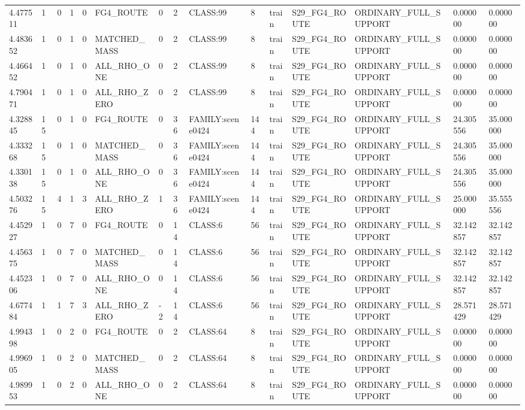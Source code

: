 \begin{tabular}{lllllllllllllll}
4.477511 & 1 & 0 & 1 & 0 & FG4\_ROUTE & 0 & 2 & CLASS:99 & 8 & train & S29\_FG4\_ROUTE & ORDINARY\_FULL\_SUPPORT & 0.000000 & 0.000000 \\
4.483652 & 1 & 0 & 1 & 0 & MATCHED\_MASS & 0 & 2 & CLASS:99 & 8 & train & S29\_FG4\_ROUTE & ORDINARY\_FULL\_SUPPORT & 0.000000 & 0.000000 \\
4.466452 & 1 & 0 & 1 & 0 & ALL\_RHO\_ONE & 0 & 2 & CLASS:99 & 8 & train & S29\_FG4\_ROUTE & ORDINARY\_FULL\_SUPPORT & 0.000000 & 0.000000 \\
4.790471 & 1 & 0 & 1 & 0 & ALL\_RHO\_ZERO & 0 & 2 & CLASS:99 & 8 & train & S29\_FG4\_ROUTE & ORDINARY\_FULL\_SUPPORT & 0.000000 & 0.000000 \\
4.328845 & 15 & 0 & 1 & 0 & FG4\_ROUTE & 0 & 36 & FAMILY:scene0424 & 144 & train & S29\_FG4\_ROUTE & ORDINARY\_FULL\_SUPPORT & 24.305556 & 35.000000 \\
4.333268 & 15 & 0 & 1 & 0 & MATCHED\_MASS & 0 & 36 & FAMILY:scene0424 & 144 & train & S29\_FG4\_ROUTE & ORDINARY\_FULL\_SUPPORT & 24.305556 & 35.000000 \\
4.330138 & 15 & 0 & 1 & 0 & ALL\_RHO\_ONE & 0 & 36 & FAMILY:scene0424 & 144 & train & S29\_FG4\_ROUTE & ORDINARY\_FULL\_SUPPORT & 24.305556 & 35.000000 \\
4.503276 & 15 & 4 & 1 & 3 & ALL\_RHO\_ZERO & 1 & 36 & FAMILY:scene0424 & 144 & train & S29\_FG4\_ROUTE & ORDINARY\_FULL\_SUPPORT & 25.000000 & 35.555556 \\
4.452927 & 1 & 0 & 7 & 0 & FG4\_ROUTE & 0 & 14 & CLASS:6 & 56 & train & S29\_FG4\_ROUTE & ORDINARY\_FULL\_SUPPORT & 32.142857 & 32.142857 \\
4.456375 & 1 & 0 & 7 & 0 & MATCHED\_MASS & 0 & 14 & CLASS:6 & 56 & train & S29\_FG4\_ROUTE & ORDINARY\_FULL\_SUPPORT & 32.142857 & 32.142857 \\
4.452306 & 1 & 0 & 7 & 0 & ALL\_RHO\_ONE & 0 & 14 & CLASS:6 & 56 & train & S29\_FG4\_ROUTE & ORDINARY\_FULL\_SUPPORT & 32.142857 & 32.142857 \\
4.677484 & 1 & 1 & 7 & 3 & ALL\_RHO\_ZERO & -2 & 14 & CLASS:6 & 56 & train & S29\_FG4\_ROUTE & ORDINARY\_FULL\_SUPPORT & 28.571429 & 28.571429 \\
4.994398 & 1 & 0 & 2 & 0 & FG4\_ROUTE & 0 & 2 & CLASS:64 & 8 & train & S29\_FG4\_ROUTE & ORDINARY\_FULL\_SUPPORT & 0.000000 & 0.000000 \\
4.996905 & 1 & 0 & 2 & 0 & MATCHED\_MASS & 0 & 2 & CLASS:64 & 8 & train & S29\_FG4\_ROUTE & ORDINARY\_FULL\_SUPPORT & 0.000000 & 0.000000 \\
4.989953 & 1 & 0 & 2 & 0 & ALL\_RHO\_ONE & 0 & 2 & CLASS:64 & 8 & train & S29\_FG4\_ROUTE & ORDINARY\_FULL\_SUPPORT & 0.000000 & 0.000000 \\

\end{tabular}
